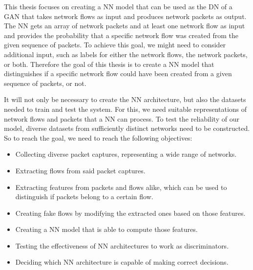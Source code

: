 \documentclass[
	ngerman,
	ruledheaders=section,%
	class=report,%
	thesis={type=bachelor},%
	accentcolor=9c,%
	custommargins=true,%
	marginpar=false,%
	parskip=half-,%
	fontsize=11pt,%
]{tudapub}
\begin{document}

This thesis focuses on creating a NN model
that can be used as the DN of a GAN
that takes network flows as input and produces network packets as output.
The NN gets an array of network packets and at least one network flow as input
and provides the probability that a specific network flow was created from the given sequence of packets.
To achieve this goal, we might need to consider additional input,
such as labels for either the network flows, the network packets, or both.
Therefore the goal of this thesis is to create a NN model that distinguishes
if a specific network flow could have been created from a given sequence of packets, or not.

It will not only be necessary to create the NN architecture,
but also the datasets needed to train and test the system.
For this, we need suitable representations of network flows and packets that a NN can process.
To test the reliability of our model, diverse datasets from sufficiently distinct networks need to be constructed.
So to reach the goal, we need to reach the following objectives:

\begin{itemize}
  \item Collecting diverse packet captures, representing a wide range of networks.
  \item Extracting flows from said packet captures.
  \item Extracting features from packets and flows alike,
which can be used to distinguish if packets belong to a certain flow.
  \item Creating fake flows by modifying the extracted ones based on those features.
  \item Creating a NN model that is able to compute those features.
  \item Testing the effectiveness of NN architectures to work as discriminators.
  \item Deciding which NN architecture is capable of making correct decisions.
\end{itemize}
\end{document}
